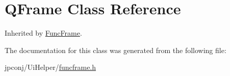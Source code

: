 \hypertarget{class_q_frame}{}\section{Q\+Frame Class Reference}
\label{class_q_frame}


Inherited by \hyperlink{class_func_frame}{Func\+Frame}.



The documentation for this class was generated from the following file\+:\begin{DoxyCompactItemize}
\item 
jpconj/\+Ui\+Helper/\hyperlink{funcframe_8h}{funcframe.\+h}\end{DoxyCompactItemize}
